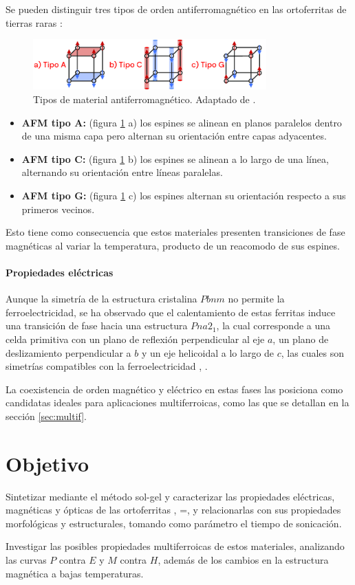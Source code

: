 \documentclass[../main.tex]{subfiles}
\begin{document}
Se pueden distinguir tres tipos de orden antiferromagnético en las ortoferritas de tierras raras \cite{KamalWarshi2018}:
\begin{figure}[H]
    \centering
    \includegraphics[width=0.8\textwidth]{fig/tiposAFM.png}
    \caption{Tipos de material antiferromagnético. Adaptado de \cite{Burema2021}.}
    \label{fig:tiposAFM}
\end{figure}
\begin{itemize}
    \item \textbf{AFM tipo A:} (figura \ref{fig:tiposAFM} a) los espines se alinean en planos paralelos dentro de una misma capa pero alternan su orientación entre capas adyacentes.
    \item \textbf{AFM tipo C:} (figura \ref{fig:tiposAFM} b) los espines se alinean a lo largo de una línea, alternando su orientación entre líneas paralelas.
    \item \textbf{AFM tipo G:} (figura \ref{fig:tiposAFM} c) los espines alternan su orientación respecto a sus primeros vecinos.
\end{itemize}
Esto tiene como consecuencia que estos materiales presenten transiciones de fase magnéticas al variar la temperatura, producto de un reacomodo de sus espines.

\subsubsection{Propiedades eléctricas}
Aunque la simetría de la estructura cristalina $Pbnm$ no permite la ferroelectricidad, se ha observado que el calentamiento de estas ferritas induce una transición de fase hacia una estructura $Pna2_1$, la cual corresponde a una celda primitiva con un plano de reflexión perpendicular al eje $a$, un plano de deslizamiento perpendicular a $b$ y un eje helicoidal a lo largo de $c$, las cuales son simetrías compatibles con la ferroelectricidad \cite{Zhang2016}, \cite{Rajaitha2022}.

La coexistencia de orden magnético y eléctrico en estas fases las posiciona como candidatas ideales para aplicaciones multiferroicas, como las que se detallan en la sección \ref{sec:multif}.
\chapter{Objetivo}
Sintetizar mediante el método sol-gel y caracterizar las propiedades eléctricas, magnéticas y ópticas de las ortoferritas , =,  y relacionarlas con sus propiedades morfológicas y estructurales, tomando como parámetro el tiempo de sonicación.

Investigar las posibles propiedades multiferroicas de estos materiales, analizando las curvas $P$ contra $E$ y $M$ contra $H$, además de los cambios en la estructura magnética a bajas temperaturas.
\end{document}
